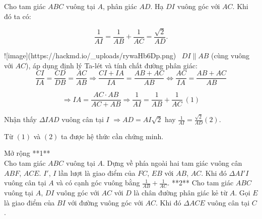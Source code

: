 \documentclass{article}
\begin{document}
\begin{markdown}

Cho tam giác $ABC$ vuông tại $A$, phân giác $AD$. Hạ $DI$ vuông góc với $AC$. Khi đó ta có:

$$\frac{1}{AI} = \frac{1}{AB} + \frac{1}{AC} = \frac{\sqrt{2}}{AD}.$$

![image](https://hackmd.io/_uploads/rywaHb6Dp.png)
\
$DI \parallel AB$ (cùng vuông với $AC$), áp dụng định lý Ta-lét và tính chất đường phân giác:
$$\frac{CI}{IA} = \frac{CD}{DB} = \frac{AC}{AB} \Rightarrow \frac{CI + IA}{IA} = \frac{AB + AC}{AB} \Leftrightarrow \frac{AC}{IA} = \frac{AB + AC}{AB}$$

$$\Rightarrow IA = \frac{AC \cdot AB}{AC + AB} \Rightarrow \frac{1}{AI} = \frac{1}{AB} + \frac{1}{AC} \ (1)$$

Nhận thấy $\Delta IAD$ vuông cân tại $I$ $\Rightarrow AD = AI\sqrt{2}$ hay $\frac{1}{AI} = \frac{\sqrt{2}}{AD} (2)$.

Từ $(1)$ và $(2)$ ta được hệ thức cần chứng minh.

Mở rộng
**1** \\
Cho tam giác $ABC$ vuông tại $A$. Dựng về phía ngoài hai tam giác vuông cân $ABF$, $ACE$. $I'$, $I$ lần lượt là giao điểm của $FC$, $EB$ với $AB$, $AC$. Khi đó $\Delta AI'I$ vuông cân tại $A$ và có cạnh góc vuông bằng $\frac{1}{AB} + \frac{1}{AC}$.
**2**
Cho tam giác $ABC$ vuông tại $A$, $DI$ vuông góc với $AC$ với $D$ là chân đường phân giác kẻ từ $A$. Gọi $E$ là giao điểm của $BI$ với đường vuông góc với $AC$. Khi đó $\Delta ACE$ vuông cân tại $C$.

\end{markdown}
\end{document}
